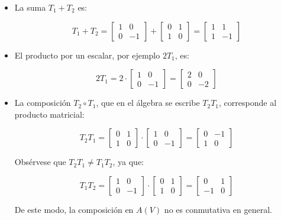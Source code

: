 \begin{itemize}
  \item La suma \(T_1 + T_2\) es:

  \[
  T_1 + T_2 =
  \begin{bmatrix}
  1 & 0 \\
  0 & -1
  \end{bmatrix}
  +
  \begin{bmatrix}
  0 & 1 \\
  1 & 0
  \end{bmatrix}
  =
  \begin{bmatrix}
  1 & 1 \\
  1 & -1
  \end{bmatrix}
  \]

  \item El producto por un escalar, por ejemplo \(2T_1\), es:

  \[
  2T_1 =
  2 \cdot
  \begin{bmatrix}
  1 & 0 \\
  0 & -1
  \end{bmatrix}
  =
  \begin{bmatrix}
  2 & 0 \\
  0 & -2
  \end{bmatrix}
  \]

  \item La composición \(T_2 \circ T_1\), que en el álgebra se escribe \(T_2 T_1\), corresponde al producto matricial:

  \[
  T_2 T_1 =
  \begin{bmatrix}
  0 & 1 \\
  1 & 0
  \end{bmatrix}
  \cdot
  \begin{bmatrix}
  1 & 0 \\
  0 & -1
  \end{bmatrix}
  =
  \begin{bmatrix}
  0 & -1 \\
  1 & 0
  \end{bmatrix}
  \]

  Obsérvese que \(T_2 T_1 \ne T_1 T_2\), ya que:

  \[
  T_1 T_2 =
  \begin{bmatrix}
  1 & 0 \\
  0 & -1
  \end{bmatrix}
  \cdot
  \begin{bmatrix}
  0 & 1 \\
  1 & 0
  \end{bmatrix}
  =
  \begin{bmatrix}
  0 & 1 \\
  -1 & 0
  \end{bmatrix}
  \]

  De este modo, la composición en \(A(V)\) no es conmutativa en general.
\end{itemize}

